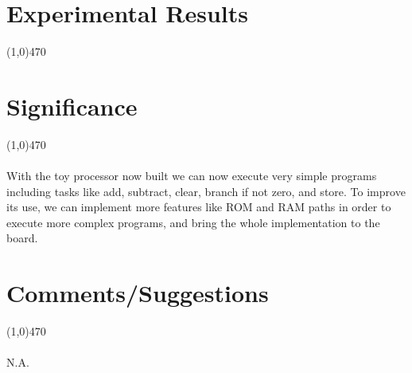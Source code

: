 \documentclass[12pt]{article}
\begin{document}
\newpage			
\section{Experimental Results}\vspace{-.7cm} \line(1,0){470}


	\newpage
\section{Significance} \vspace{-.7cm} \line(1,0){470}
	\paragraph{} 
		With the toy processor now built we can now execute very simple programs including tasks like add, subtract, clear, branch if not zero, and store. To improve its use, we can implement more features like ROM and RAM paths in order to execute more complex programs, and bring the whole implementation to the board. 

 \section{Comments/Suggestions}\vspace{-.7cm} \line(1,0){470}
 	\paragraph{} 
 		N.A.
		
\end{document}
